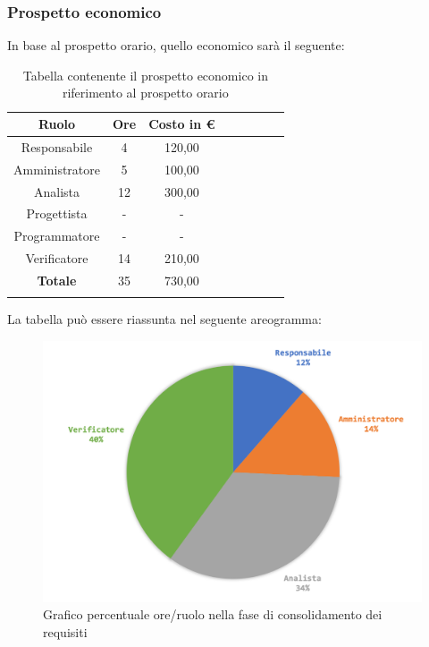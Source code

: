		\subsubsection{Prospetto economico}
		In base al prospetto orario, quello economico sarà il seguente: 
		
			\begin{longtable}{|c|c|c|c|c|c|c|c|}
				\hline
				\rowcolor{lighter-grayer}
				\textbf{Ruolo} & \textbf{Ore} & \textbf{Costo in €} \\
				\hline
				\endfirsthead
				
				\hline
				Responsabile & 4 & 120,00\\
				\hline
				\hline
				Amministratore & 5 & 100,00\\
				\hline
				\hline
				Analista & 12 & 300,00\\
				\hline
				\hline
				Progettista & - & -\\
				\hline
				\hline
				Programmatore & -  & -\\
				\hline
				\hline
				Verificatore & 14 & 210,00\\
				\hline
				\textbf{Totale} & 35 & 730,00\\
				\hline
				\caption{Tabella contenente il prospetto economico in riferimento al prospetto orario}
			\end{longtable}
			\pagebreak
			
			La tabella può essere riassunta nel seguente areogramma:
			\begin{figure}[H]
				\centering
				\includegraphics[width=0.8\linewidth]{./images/preventivo/consRequisiti2.png}
				\caption{Grafico percentuale ore/ruolo nella fase di consolidamento dei requisiti}
				\label{fig:grafico costi ruolo fase consolidamento dei requisiti}
			\end{figure}
	
